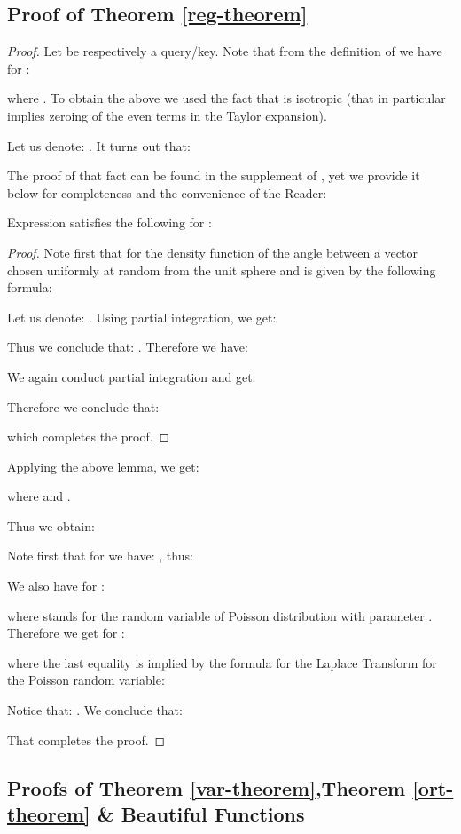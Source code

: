 \subsection{Proof of Theorem \ref{reg-theorem}}
\begin{proof}
Let  be respectively a query/key.
Note that from the definition of  we have
for :

where . To obtain the above we used the fact that  is isotropic (that in particular implies zeroing of the even terms in the Taylor expansion).

Let us denote: . It turns out that:

The proof of that fact can be found in the supplement of \citep{geom}, yet we provide it below for completeness and the convenience of the Reader:
\begin{lemma}
Expression  satisfies the following for  :

\end{lemma}
\begin{proof}
Note first that for  the density function  of the angle between a vector  chosen uniformly at random from the unit sphere and  is given by the following formula:

Let us denote: .
Using partial integration, we get:

Thus we conclude that: .
Therefore we have: 

We again conduct partial integration and get:

Therefore we conclude that:

which completes the proof.
\end{proof}
Applying the above lemma, we get:

where 
and .

Thus we obtain:

Note first that for  we have: , thus:

We also have for :

where  stands for the random variable of Poisson distribution with parameter .
Therefore we get for :

where the last equality is implied by the formula for the Laplace Transform for the Poisson random variable:

Notice that: 
.
We conclude that:

That completes the proof.
\end{proof}

\subsection{Proofs of Theorem \ref{var-theorem},Theorem \ref{ort-theorem} \& Beautiful Functions}


